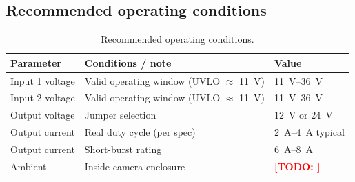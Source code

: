 \documentclass[11pt,a4paper]{article}
\newcommand{\todo}[1]{\textcolor{red}{\textbf{[TODO: #1]}}}
\begin{document}
\subsection{Recommended operating conditions}
\label{sec:datasheet-operating}
\begin{table}[H]
  \centering
  \begin{tabularx}{\linewidth}{@{}lXl@{}}
    \toprule
    \textbf{Parameter} & \textbf{Conditions / note} & \textbf{Value} \\
    \midrule
    Input 1 voltage & Valid operating window (UVLO $\approx$ \SI{11}{\V}) & \SIrange{11}{36}{\V} \\
    Input 2 voltage & Valid operating window (UVLO $\approx$ \SI{11}{\V}) & \SIrange{11}{36}{\V} \\
    Output voltage  & Jumper selection                                            & \SI{12}{\V} or \SI{24}{\V} \\
    Output current  & Real duty cycle (per spec)                                  & \SIrange{2}{4}{\A} typical \\
    Output current  & Short-burst rating                                          & \SIrange{6}{8}{\A} \\
    Ambient         & Inside camera enclosure                                      & \todo{} \\
    \bottomrule
  \end{tabularx}
  \caption{Recommended operating conditions.}
\end{table}
\end{document}
